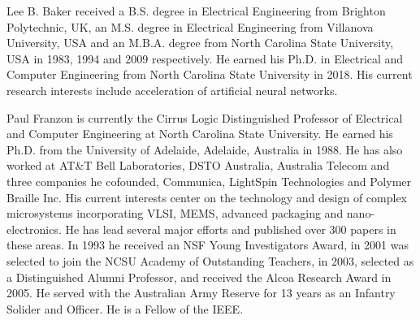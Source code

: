 \documentclass[journal]{IEEEtran}
\begin{document}

%
%


%

% 
\begin{IEEEbiographynophoto}{Lee B. Baker}
received a B.S. degree in Electrical Engineering from Brighton Polytechnic, UK, an M.S. degree in Electrical Engineering from Villanova University, USA and an M.B.A. degree from North Carolina State University, USA in 1983, 1994 and 2009 respectively. He earned his Ph.D. in Electrical and Computer Engineering from North Carolina State University in 2018.
His current research interests include acceleration of artificial neural networks.
\end{IEEEbiographynophoto}
\begin{IEEEbiographynophoto}{Paul Franzon}
is currently the Cirrus Logic Distinguished Professor of Electrical and Computer Engineering at North Carolina State University.  He earned his Ph.D. from the University of Adelaide, Adelaide, Australia in 1988.  He has also worked at AT\&T Bell Laboratories, DSTO Australia, Australia Telecom and three companies he cofounded, Communica, LightSpin Technologies and Polymer Braille Inc. His current interests center on the technology and design of complex microsystems incorporating VLSI, MEMS, advanced packaging and nano-electronics. He has lead several major efforts and published over 300 papers in these areas.  In 1993 he received an NSF Young Investigators Award, in 2001 was selected to join the NCSU Academy of Outstanding Teachers, in 2003, selected as a Distinguished Alumni Professor, and received the Alcoa Research Award in 2005.  He served with the Australian Army Reserve for 13 years as an Infantry Solider and Officer.  He is a Fellow of the IEEE.
\end{IEEEbiographynophoto}
\end{document}

